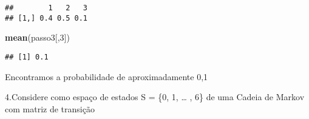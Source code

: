 \documentclass[
]{article}
\newenvironment{Shaded}{\begin{snugshade}}{\end{snugshade}}
\newcommand{\DecValTok}[1]{\textcolor[rgb]{0.00,0.00,0.81}{#1}}
\newcommand{\KeywordTok}[1]{\textcolor[rgb]{0.13,0.29,0.53}{\textbf{#1}}}
\newcommand{\NormalTok}[1]{#1}
\begin{document}
\begin{verbatim}
##        1   2   3
## [1,] 0.4 0.5 0.1
\end{verbatim}

\begin{Shaded}
\begin{Highlighting}[]
\KeywordTok{mean}\NormalTok{(passo3[,}\DecValTok{3}\NormalTok{])}
\end{Highlighting}
\end{Shaded}

\begin{verbatim}
## [1] 0.1
\end{verbatim}

Encontramos a probabilidade de aproximadamente 0,1

4.Considere como espaço de estados S = \{0, 1, \ldots{} , 6\} de uma
Cadeia de Markov com matriz de transição
\end{document}
